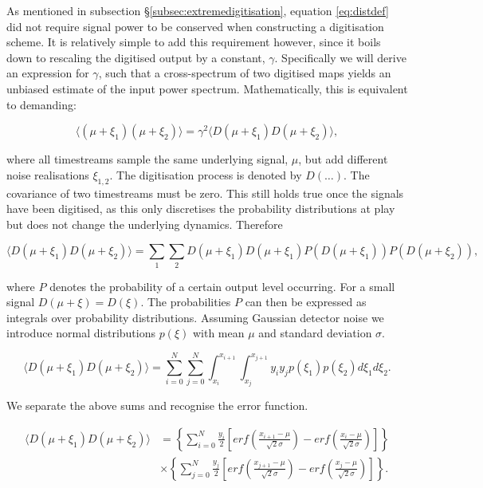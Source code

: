 \documentclass[apj]{emulateapj}
\begin{document}
As mentioned in subsection \S\ref{subsec:extremedigitisation}, equation \ref{eq:distdef} did not require signal power to be conserved when constructing a digitisation scheme. It is relatively simple to add this requirement however, since it boils down to rescaling the digitised output by a constant, $\gamma$. Specifically we will derive an expression for $\gamma$, such that a cross-spectrum of two digitised maps yields an unbiased estimate of the input power spectrum. Mathematically, this is equivalent to demanding:

\begin{equation} \label{eq:normcrosspower}
\langle (\mu + \xi_1) (\mu + \xi_2) \rangle = \gamma^2 \langle D(\mu + \xi_1) D(\mu + \xi_2) \rangle,
\end{equation}

where all timestreams sample the same underlying signal, $\mu$, but add different noise realisations $\xi_{1, 2}$. The digitisation process is denoted by $D(\dots)$. The covariance of two timestreams must be zero. This still holds true once the signals have been digitised, as this only discretises the probability distributions at play but does not change the underlying dynamics. Therefore

\begin{equation}
\langle D(\mu + \xi_1) D(\mu + \xi_2) \rangle = \sum_1 \sum_2 D(\mu + \xi_1) D(\mu + \xi_1) P(D(\mu + \xi_1)) P(D(\mu + \xi_2)),
\end{equation}

where $P$ denotes the probability of a certain output level occurring. For a small signal $D(\mu + \xi)=D(\xi)$. The probabilities $P$ can then be expressed as integrals over probability distributions. Assuming Gaussian detector noise we introduce normal distributions $p(\xi)$ with mean $\mu$ and standard deviation $\sigma$.

\begin{equation}
\langle D(\mu + \xi_1) D(\mu + \xi_2) \rangle = \sum_{i=0}^N \sum_{j=0}^N  \int_{x_i}^{x_{i+1}} \int_{x_j}^{x_{j+1}} y_i y_j p(\xi_1) p(\xi_2) d\xi_1 d\xi_2.
\end{equation}

We separate the above sums and recognise the error function.

\begin{equation}
\begin{aligned}
\langle D(\mu + \xi_1) D(\mu + \xi_2) \rangle &= \left\{ \sum_{i=0}^N  \frac{y_i}{2} \left[ erf \left( \frac{x_{i+1} - \mu}{\sqrt{2}\sigma} \right) - erf \left( \frac{x_{i} - \mu}{\sqrt{2}\sigma} \right) \right] \right\} \\
&\times \left\{  \sum_{j=0}^N \frac{y_j}{2} \left[ erf \left( \frac{x_{j+1} - \mu}{\sqrt{2}\sigma} \right) - erf \left( \frac{x_{j} - \mu}{\sqrt{2}\sigma} \right) \right] \right\}.
\end{aligned}
\end{equation}
\end{document}
